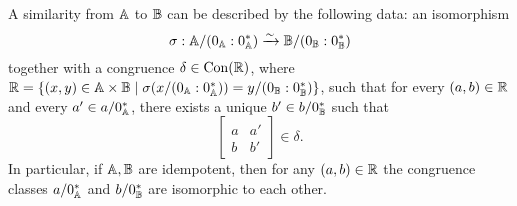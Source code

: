 \begin{appendices}
\begin{cor}\label{similar-detail} A similarity from $\mathbb{A}$ to $\mathbb{B}$ can be described by the following data: an isomorphism
\[
\sigma: \mathbb{A}/(0_{\mathbb{A}}:0_{\mathbb{A}}^*) \xrightarrow{\sim} \mathbb{B}/(0_{\mathbb{B}}:0_{\mathbb{B}}^*)
\]
together with a congruence $\delta \in \operatorname{Con}(\mathbb{R})$, where $\mathbb{R} = \{(x,y) \in \mathbb{A} \times \mathbb{B} \mid \sigma(x/(0_{\mathbb{A}}:0_{\mathbb{A}}^*)) = y/(0_{\mathbb{B}}:0_{\mathbb{B}}^*)\}$, such that for every $(a,b) \in \mathbb{R}$ and every $a' \in a/0_{\mathbb{A}}^*$, there exists a unique $b' \in b/0_{\mathbb{B}}^*$ such that
\[
\begin{bmatrix} a & a'\\ b & b'\end{bmatrix} \in \delta.
\]
In particular, if $\mathbb{A}, \mathbb{B}$ are idempotent, then for any $(a,b) \in \mathbb{R}$ the congruence classes $a/0_{\mathbb{A}}^*$ and $b/0_{\mathbb{B}}^*$ are isomorphic to each other.
\end{cor}


\end{appendices}
